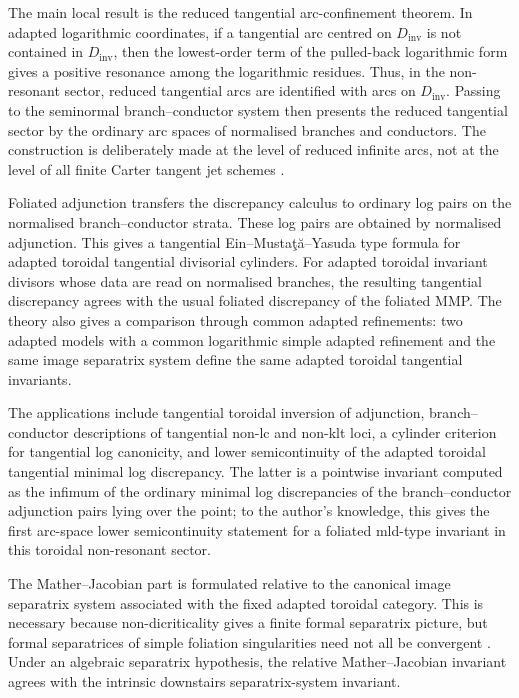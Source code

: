 \documentclass[11pt]{amsart}
\numberwithin{equation}{section}
\theoremstyle{plain}
\theoremstyle{definition}
\newcommand{\Dinv}{D_{\mathrm{inv}}}
\begin{document}
The main local result is the reduced tangential arc-confinement theorem.  In
adapted logarithmic coordinates, if a tangential arc centred on \(\Dinv\) is
not contained in \(\Dinv\), then the lowest-order term of the pulled-back
logarithmic form gives a positive resonance among the logarithmic residues.
Thus, in the non-resonant sector, reduced tangential arcs are identified with
arcs on \(\Dinv\).  Passing to the seminormal branch--conductor system
then presents the reduced tangential sector by the ordinary arc spaces of
normalised branches and conductors.  The construction is deliberately made at
the level of reduced infinite arcs, not at the level of all finite Carter
tangent jet schemes \cite{Carter,CarterThesis}.

Foliated adjunction transfers the discrepancy calculus to ordinary log pairs
on the normalised branch--conductor strata.  These log pairs are obtained by
normalised adjunction.  This gives a tangential
Ein--Musta\c{t}\u{a}--Yasuda type formula for adapted toroidal tangential
divisorial cylinders.  For adapted toroidal invariant divisors whose data are
read on normalised branches, the resulting tangential discrepancy agrees with
the usual foliated discrepancy of the foliated MMP.  The theory also gives a
comparison through common adapted refinements: two adapted models with a
common logarithmic simple adapted refinement and the same image separatrix
system define the same adapted toroidal tangential invariants.

The applications include tangential toroidal inversion of adjunction,
branch--conductor descriptions of tangential non-lc and non-klt loci, a
cylinder criterion for tangential log canonicity, and lower semicontinuity of
the adapted toroidal tangential minimal log discrepancy.  The latter is a
pointwise invariant computed as the infimum of the ordinary minimal log
discrepancies of the branch--conductor adjunction pairs lying over the point;
to the author's knowledge, this gives the first arc-space lower
semicontinuity statement for a foliated mld-type invariant in this toroidal
non-resonant sector.

The Mather--Jacobian part is formulated relative to the canonical image
separatrix system associated with the fixed adapted toroidal category.  This
is necessary because non-dicriticality gives a finite formal separatrix
picture, but formal separatrices of simple foliation singularities need not
all be convergent \cite{Spicer}.  Under an algebraic separatrix hypothesis,
the relative Mather--Jacobian invariant agrees with the intrinsic downstairs
separatrix-system invariant.
\end{document}
